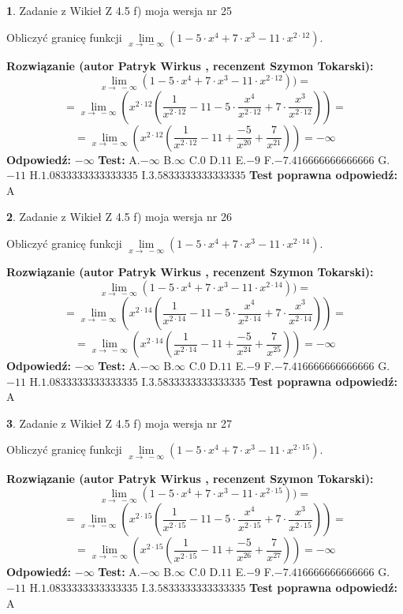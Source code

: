 \documentclass[12pt, a4paper]{article}
\theoremstyle{definition} %
\newtheorem{zad}{}
\newcommand{\zadStart}[1]{\begin{zad}#1\newline}
\newcommand{\zadStop}{\end{zad}}
\newcommand{\rozwStart}[2]{\noindent \textbf{Rozwiązanie (autor #1 , recenzent #2): }\newline}
\newcommand{\rozwStop}{\newline}
\newcommand{\odpStart}{\noindent \textbf{Odpowiedź:}\newline}
\newcommand{\odpStop}{\newline}
\newcommand{\testStart}{\noindent \textbf{Test:}\newline}
\newcommand{\testStop}{\newline}
\newcommand{\kluczStart}{\noindent \textbf{Test poprawna odpowiedź:}\newline}
\newcommand{\kluczStop}{\newline}
\begin{document}
\zadStart{Zadanie z Wikieł Z 4.5 f) moja wersja nr 25}


Obliczyć granicę funkcji  $\lim\limits_{x\to\ -\infty}(1 - 5 \cdot x^{4}+7 \cdot x^{3}- 11 \cdot x^{2\cdot12})$.
\zadStop
\rozwStart{Patryk Wirkus}{Szymon Tokarski}
$$\lim\limits_{x\to\ -\infty}(1 - 5 \cdot x^{4}+7 \cdot x^{3}- 11 \cdot x^{2\cdot12}))=$$
$$=\lim\limits_{x\to\ -\infty}(x^{2\cdot12}(\frac{1}{x^{2\cdot12}}-11 -5 \cdot \frac{x^{4}}{x^{2\cdot12}}+7 \cdot \frac{x^{3}}{x^{2\cdot12}}))=$$
$$=\lim\limits_{x\to\ -\infty}(x^{2\cdot12}(\frac{1}{x^{2\cdot12}}-11 + \frac{-5}{x^{20}}+ \frac{7}{x^{21}}))=-\infty$$
\rozwStop
\odpStart
$-\infty$
\odpStop
\testStart
A.$-\infty$ B.$\infty$ C.$0$ D.$11$ E.$-9$
F.$-7.416666666666666$ G.$-11$
H.$1.0833333333333335$
I.$3.5833333333333335$
\testStop
\kluczStart
A
\kluczStop



\zadStart{Zadanie z Wikieł Z 4.5 f) moja wersja nr 26}


Obliczyć granicę funkcji  $\lim\limits_{x\to\ -\infty}(1 - 5 \cdot x^{4}+7 \cdot x^{3}- 11 \cdot x^{2\cdot14})$.
\zadStop
\rozwStart{Patryk Wirkus}{Szymon Tokarski}
$$\lim\limits_{x\to\ -\infty}(1 - 5 \cdot x^{4}+7 \cdot x^{3}- 11 \cdot x^{2\cdot14}))=$$
$$=\lim\limits_{x\to\ -\infty}(x^{2\cdot14}(\frac{1}{x^{2\cdot14}}-11 -5 \cdot \frac{x^{4}}{x^{2\cdot14}}+7 \cdot \frac{x^{3}}{x^{2\cdot14}}))=$$
$$=\lim\limits_{x\to\ -\infty}(x^{2\cdot14}(\frac{1}{x^{2\cdot14}}-11 + \frac{-5}{x^{24}}+ \frac{7}{x^{25}}))=-\infty$$
\rozwStop
\odpStart
$-\infty$
\odpStop
\testStart
A.$-\infty$ B.$\infty$ C.$0$ D.$11$ E.$-9$
F.$-7.416666666666666$ G.$-11$
H.$1.0833333333333335$
I.$3.5833333333333335$
\testStop
\kluczStart
A
\kluczStop



\zadStart{Zadanie z Wikieł Z 4.5 f) moja wersja nr 27}


Obliczyć granicę funkcji  $\lim\limits_{x\to\ -\infty}(1 - 5 \cdot x^{4}+7 \cdot x^{3}- 11 \cdot x^{2\cdot15})$.
\zadStop
\rozwStart{Patryk Wirkus}{Szymon Tokarski}
$$\lim\limits_{x\to\ -\infty}(1 - 5 \cdot x^{4}+7 \cdot x^{3}- 11 \cdot x^{2\cdot15}))=$$
$$=\lim\limits_{x\to\ -\infty}(x^{2\cdot15}(\frac{1}{x^{2\cdot15}}-11 -5 \cdot \frac{x^{4}}{x^{2\cdot15}}+7 \cdot \frac{x^{3}}{x^{2\cdot15}}))=$$
$$=\lim\limits_{x\to\ -\infty}(x^{2\cdot15}(\frac{1}{x^{2\cdot15}}-11 + \frac{-5}{x^{26}}+ \frac{7}{x^{27}}))=-\infty$$
\rozwStop
\odpStart
$-\infty$
\odpStop
\testStart
A.$-\infty$ B.$\infty$ C.$0$ D.$11$ E.$-9$
F.$-7.416666666666666$ G.$-11$
H.$1.0833333333333335$
I.$3.5833333333333335$
\testStop
\kluczStart
A
\kluczStop
\end{document}
